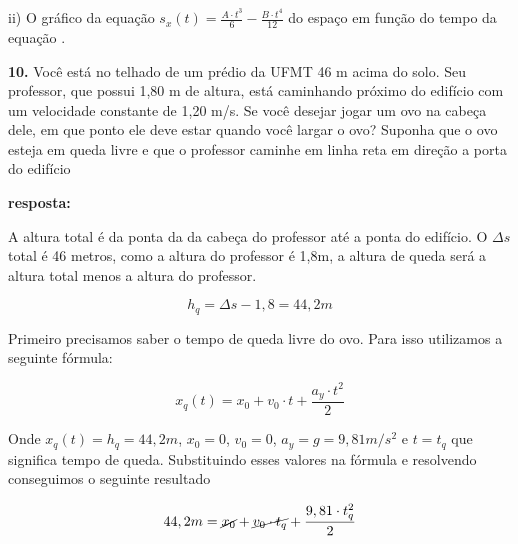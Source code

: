 \documentclass[a4paper, 12pt]{article}
\begin{document}
\begin{flushleft}
		ii) O gráfico da equação $s_x(t) = \frac{A \cdot t^3}{6} - \frac{B \cdot t^4}{12}$ do espaço em função do tempo da equação .
		\begin{center}
		\end{center}
		
		\vspace{2em}
		
		\textbf{10.} Você está no telhado de um prédio da UFMT 46 m acima do solo. Seu professor, que possui 1,80 m de altura, está caminhando próximo do edifício com um velocidade constante de 1,20 m/s. Se você desejar jogar um ovo na cabeça dele, em que ponto ele deve estar quando você largar o ovo? Suponha que o ovo esteja em queda livre e que o professor caminhe em linha reta em direção a porta do edifício
		
		\textbf{resposta:}
		
		A altura total é da ponta da da cabeça do professor até a ponta do edifício. O $\Delta{s}$ total é 46 metros, como a altura do professor é 1,8m, a altura de queda será a altura total menos a altura do professor.
		
		\begin{equation*}
			h_q = \Delta{s} - 1,8 = 44,2m
		\end{equation*}
		
		Primeiro precisamos saber o tempo de queda livre do ovo. Para isso utilizamos a seguinte fórmula:
		
		\begin{equation*}
			x_q(t) = x_0 + v_0 \cdot t + \frac{a_y \cdot t^2}{2}
		\end{equation*}
		
		Onde $x_q(t) = h_q = 44,2m$, $x_0 = 0$, $v_0 = 0$, $a_y = g = 9,81 m/s^2$ e $t = t_q$ que significa tempo de queda. Substituindo esses valores na fórmula e resolvendo conseguimos o seguinte resultado
		
		\begin{equation*}
			44,2m = \cancel{x_0} + \cancel{v_0 \cdot t_q} + \frac{9,81 \cdot t_q^2}{2}
		\end{equation*}
		

\end{flushleft}
\end{document}
